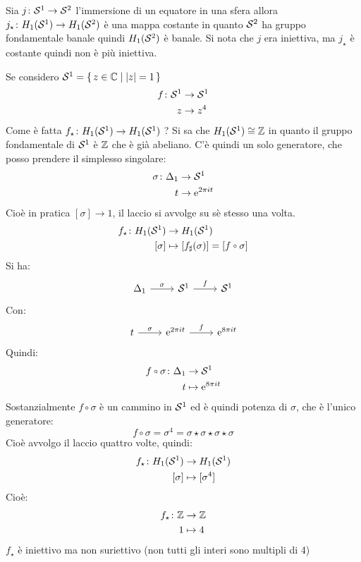 \begin{example}
  Sia $ j \colon \mathcal{S}^{1} \to \mathcal{S}^{2} $ l'immersione di un equatore in una sfera allora
  $ j_\star \colon H_1(\mathcal{S}^{1}) \to H_1(\mathcal{S}^{2}) $  è una mappa costante in quanto $ \mathcal{S}^{2} $
  ha gruppo fondamentale banale quindi $ H_1(\mathcal{S}^{2}) $ è banale.
  Si nota che $ j $ era iniettiva,  ma $ j_\star $ è costante quindi non è più iniettiva.
\end{example}
\begin{example}
  Se considero $ \mathcal{S}^{1} = \set{z \in \mathbb{C} | |z| = 1 } $
  \begin{align*}
    f \colon \mathcal{S}^{1} & \to \mathcal{S}^{1} \\
    z & \to z^4
  \end{align*}
  Come è fatta $ f_\star \colon H_1(\mathcal{S}^{1}) \to H_1(\mathcal{S}^{1})$ ?
  Si sa che $ H_1(\mathcal{S}^{1}) \cong \mathbb{Z} $ in quanto il gruppo fondamentale di $ \mathcal{S}^{1} $
  è $ \mathbb{Z} $ che è già abeliano. C'è quindi un solo generatore, che posso prendere
  il simplesso singolare:
  \begin{align*}
    \sigma \colon \Delta_1 & \to \mathcal{S}^{1} \\
    t & \to \mathrm{e}^{2 \pi i t}
  \end{align*}
  Cioè in pratica $ [\sigma] \to 1 $, il laccio si avvolge su sè stesso una volta.
  \begin{align*}
    f_\star \colon H_1(\Sph{1}) & \to H_1(\Sph{1}) \\
    [\sigma] & \mapsto [f_\sharp (\sigma)] = [f \circ \sigma]
  \end{align*}
  Si ha:
  \[
    \begin{tikzcd}
      \Delta_1 \arrow{r}{\sigma} & \Sph{1} \arrow{r}{f} & \Sph{1}
    \end{tikzcd}
  \]
  Con:
  \[
    \begin{tikzcd}
      t \arrow{r}{\sigma} & \me^{2 \pi i t} \arrow{r}{f} & \me^{8 \pi i t}
    \end{tikzcd}
  \]
  Quindi:
  \begin{align*}
    f \circ \sigma \colon \Delta_1 & \to \Sph{1} \\
    t & \mapsto \me^{8 \pi i t}
  \end{align*}
  Sostanzialmente $ f \circ \sigma $ è un cammino in $ \mathcal{S}^{1} $ ed è
  quindi potenza di $ \sigma $, che è l'unico generatore:
  \[
    f \circ \sigma = \sigma^4 = \sigma \star \sigma \star \sigma \star \sigma
  \]
  Cioè avvolgo il laccio quattro volte, quindi:
  \begin{align*}
    f_\star \colon H_1(\mathcal{S}^{1}) & \to H_1(\mathcal{S}^{1}) \\
    [\sigma] & \mapsto [\sigma^4]
  \end{align*}
  Cioè:
  \begin{align*}
    f_\star \colon \mathbb{Z} & \to \mathbb{Z} \\
    1 & \mapsto 4
  \end{align*}
  $ f_\star $ è iniettivo ma non suriettivo (non tutti gli interi sono
  multipli di 4)
\end{example}

